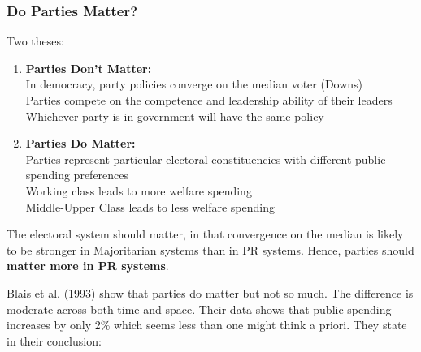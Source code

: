\documentclass[12pt, letterpaper]{article}
\begin{document}
\subsubsection{Do Parties Matter?}
Two theses:
\begin{enumerate}
	\item \textbf{Parties Don't Matter:}\\
		In democracy, party policies converge on the median voter (Downs)\\
		Parties compete on the competence and leadership ability of their leaders\\
		Whichever party is in government will have the same policy
	\item \textbf{Parties Do Matter:}\\
		Parties represent particular electoral constituencies with different public spending preferences\\
		Working class leads to more welfare spending\\
		Middle-Upper Class leads to less welfare spending
\end{enumerate}
The electoral system should matter, in that convergence on the median is likely to be stronger in Majoritarian systems than in PR systems. Hence, parties should \textbf{matter more in PR systems}.

Blais et al. (1993) show that parties do matter but not so much. The difference is moderate across both time and space. Their data shows that public spending increases by only 2\% which seems less than one might think a priori. They state in their conclusion:
\begin{center}
\end{center}
\end{document}
